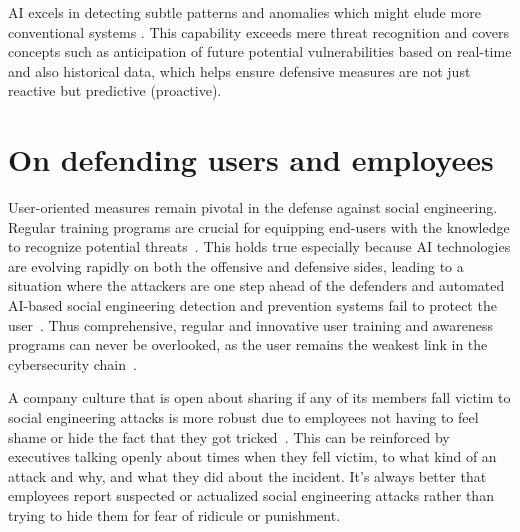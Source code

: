 AI excels in detecting subtle patterns and anomalies which might elude more conventional systems \citep{fakhouri_AI_Driven_Solutions_SE_Attacks_2024}. This capability exceeds mere threat recognition and covers concepts such as anticipation of future potential vulnerabilities based on real-time and also historical data, which helps ensure defensive measures are not just reactive but predictive (proactive).


\section{On defending users and employees}
\begin{comment}
\end{comment}

User-oriented measures remain pivotal in the defense against social engineering. Regular training programs are crucial for equipping end-users with the knowledge to recognize potential threats~\citep{hadnagy_Social_Engineering_The_Science_2018}. This holds true especially because AI technologies are evolving rapidly on both the offensive and defensive sides, leading to a situation where the attackers are one step ahead of the defenders and automated AI-based social engineering detection and prevention systems fail to protect the user~\citep{fakhouri_AI_Driven_Solutions_SE_Attacks_2024}. Thus comprehensive, regular and innovative user training and awareness programs can never be overlooked, as the user remains the weakest link in the cybersecurity chain~\citep{mitnick_The_Art_of_Deception_2003}.

A company culture that is open about sharing if any of its members fall victim to social engineering attacks is more robust due to employees not having to feel shame or hide the fact that they got tricked~\citep{hadnagy_Social_Engineering_The_Science_2018}. This can be reinforced by executives talking openly about times when they fell victim, to what kind of an attack and why, and what they did about the incident. It's always better that employees report suspected or actualized social engineering attacks rather than trying to hide them for fear of ridicule or punishment.

